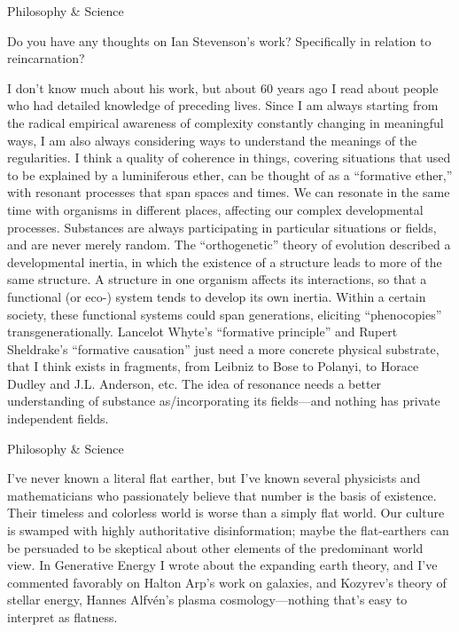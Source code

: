 \documentclass[11pt,oneside,openany,extrafontsizes]{memoir}
\begin{document}
\begin{qaexchange}{Philosophy \& Science}

    \begin{question}
        Do you have any thoughts on Ian Stevenson's work? Specifically in relation to reincarnation?
    \end{question}

    \begin{answer}
      I don't know much about his work, but about 60 years ago I read about people who had detailed knowledge of preceding lives. Since I am always starting from the radical empirical awareness of complexity constantly changing in meaningful ways, I am also always considering ways to understand the meanings of the regularities. I think a quality of coherence in things, covering situations that used to be explained by a luminiferous ether, can be thought of as a \enquote{formative ether,} with resonant processes that span spaces and times. We can resonate in the same time with organisms in different places, affecting our complex developmental processes. Substances are always participating in particular situations or fields, and are never merely random. The \enquote{orthogenetic} theory of evolution described a developmental inertia, in which the existence of a structure leads to more of the same structure. A structure in one organism affects its interactions, so that a functional (or eco-) system tends to develop its own inertia. Within a certain society, these functional systems could span generations, eliciting \enquote{phenocopies} transgenerationally. Lancelot Whyte's \enquote{formative principle} and Rupert Sheldrake's \enquote{formative causation} just need a more concrete physical substrate, that I think exists in fragments, from Leibniz to Bose to Polanyi, to Horace Dudley and J.L. Anderson, etc. The idea of resonance needs a better understanding of substance as/incorporating its fields—and nothing has private independent fields.
    \end{answer}
\end{qaexchange}

\begin{standalonequote}{Philosophy \& Science}

    \begin{answer}
       I've never known a literal flat earther, but I've known several physicists and mathematicians who passionately believe that number is the basis of existence. Their timeless and colorless world is worse than a simply flat world. Our culture is swamped with highly authoritative disinformation; maybe the flat-earthers can be persuaded to be skeptical about other elements of the predominant world view. In Generative Energy I wrote about the expanding earth theory, and I've commented favorably on Halton Arp's work on galaxies, and Kozyrev's theory of stellar energy, Hannes Alfvén's plasma cosmology—nothing that's easy to interpret as flatness. 
    \end{answer}
\end{standalonequote}
\end{document}
